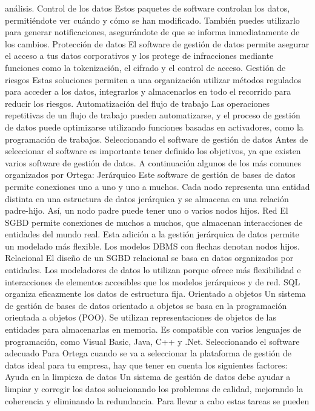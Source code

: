 \documentclass[
  letterpaper,
  DIV=11,
  numbers=noendperiod]{scrreprt}
\begin{document}
análisis. Control de los datos Estos paquetes de software controlan los
datos, permitiéndote ver cuándo y cómo se han modificado. También puedes
utilizarlo para generar notificaciones, asegurándote de que se informa
inmediatamente de los cambios. Protección de datos El software de
gestión de datos permite asegurar el acceso a tus datos corporativos y
los protege de infracciones mediante funciones como la tokenización, el
cifrado y el control de acceso. Gestión de riesgos Estas soluciones
permiten a una organización utilizar métodos regulados para acceder a
los datos, integrarlos y almacenarlos en todo el recorrido para reducir
los riesgos. Automatización del flujo de trabajo Las operaciones
repetitivas de un flujo de trabajo pueden automatizarse, y el proceso de
gestión de datos puede optimizarse utilizando funciones basadas en
activadores, como la programación de trabajos. Seleccionando el software
de gestión de datos Antes de seleccionar el software es importante tener
definido los objetivos, ya que existen varios software de gestión de
datos. A continuación algunos de los más comunes organizados por Ortega:
Jerárquico Este software de gestión de bases de datos permite conexiones
uno a uno y uno a muchos. Cada nodo representa una entidad distinta en
una estructura de datos jerárquica y se almacena en una relación
padre-hijo. Así, un nodo padre puede tener uno o varios nodos hijos. Red
El SGBD permite conexiones de muchos a muchos, que almacenan
interacciones de entidades del mundo real. Esta adición a la gestión
jerárquica de datos permite un modelado más flexible. Los modelos DBMS
con flechas denotan nodos hijos. Relacional El diseño de un SGBD
relacional se basa en datos organizados por entidades. Los modeladores
de datos lo utilizan porque ofrece más flexibilidad e interacciones de
elementos accesibles que los modelos jerárquicos y de red. SQL organiza
eficazmente los datos de estructura fija. Orientado a objetos Un sistema
de gestión de bases de datos orientado a objetos se basa en la
programación orientada a objetos (POO). Se utilizan representaciones de
objetos de las entidades para almacenarlas en memoria. Es compatible con
varios lenguajes de programación, como Visual Basic, Java, C++ y .Net.
Seleccionando el software adecuado Para Ortega cuando se va a
seleccionar la plataforma de gestión de datos ideal para tu empresa, hay
que tener en cuenta los siguientes factores: Ayuda en la limpieza de
datos Un sistema de gestión de datos debe ayudar a limpiar y corregir
los datos solucionando los problemas de calidad, mejorando la coherencia
y eliminando la redundancia. Para llevar a cabo estas tareas se pueden
\end{document}
